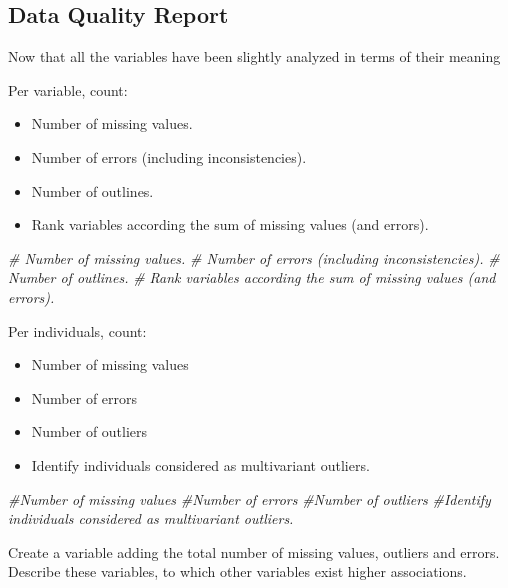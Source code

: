 \documentclass[
]{article}
\newenvironment{Shaded}{\begin{snugshade}}{\end{snugshade}}
\newcommand{\CommentTok}[1]{\textcolor[rgb]{0.56,0.35,0.01}{\textit{#1}}}
\providecommand{\tightlist}{%
  \setlength{\itemsep}{0pt}\setlength{\parskip}{0pt}}
\begin{document}
\subsection{Data Quality Report}\label{data-quality-report}

Now that all the variables have been slightly analyzed in terms of their
meaning

Per variable, count:

\begin{itemize}
\tightlist
\item
  Number of missing values.
\item
  Number of errors (including inconsistencies).
\item
  Number of outlines.
\item
  Rank variables according the sum of missing values (and errors).
\end{itemize}

\begin{Shaded}
\begin{Highlighting}[]
\CommentTok{\# Number of missing values.}
\CommentTok{\# Number of errors (including inconsistencies).}
\CommentTok{\# Number of outlines.}
\CommentTok{\# Rank variables according the sum of missing values (and errors).}
\end{Highlighting}
\end{Shaded}

Per individuals, count:

\begin{itemize}
\tightlist
\item
  Number of missing values
\item
  Number of errors
\item
  Number of outliers
\item
  Identify individuals considered as multivariant outliers.
\end{itemize}

\begin{Shaded}
\begin{Highlighting}[]
\CommentTok{\#Number of missing values}
\CommentTok{\#Number of errors}
\CommentTok{\#Number of outliers}
\CommentTok{\#Identify individuals considered as multivariant outliers.}
\end{Highlighting}
\end{Shaded}

Create a variable adding the total number of missing values, outliers
and errors. Describe these variables, to which other variables exist
higher associations.
\end{document}
